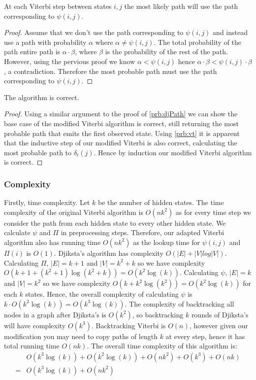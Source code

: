 \begin{lemma}
    \label{prb:vt}
    At each Viterbi step between states $i,j$ the most likely path will use the path corresponding to $\psi(i,j)$.
\end{lemma}
\begin{proof}
Assume that we don't use the path corresponding to $\psi(i,j)$ and instead use a path with probability $\alpha$ where $\alpha \neq \psi(i,j)$.
The total probability of the path entire path is $\alpha \cdot \beta$, where $\beta$ is the probability of the rest of the path.
However, using the pervious proof we know $\alpha < \psi(i,j)$ hence $\alpha \cdot \beta < \psi(i,j) \cdot \beta$, a contradiction. 
Therefore the most probable path must use the path corresponding to $\psi(i,j)$. 
\end{proof}

\begin{lemma}
    \label{prb:final}
    The algorithm is correct. 
\end{lemma}
\begin{proof}
Using a similar argument to the proof of \cref{prb:djPath} we can show the base case of the modified Viterbi algorithm is correct, still returning the most probable path that emits the first observed state. 
Using \cref{prb:vt} it is apparent that the inductive step of our modified Viterbi is also correct, calculating the most probable path to $\delta_t(j)$. Hence by induction our modified Viterbi algorithm is correct.
\end{proof}

  



\subsubsection*{Complexity}
Firstly, time complexity. 
Let $k$ be the number of hidden states.
The time complexity of the original Viterbi algorithm is $O(nk^2)$ as for every time step we consider the path from each hidden state to every other hidden state. We calculate $\psi$ and $\Pi$ in preprocessing steps.
Therefore, our adapted Viterbi algorithm also has running time $O(nk^2)$ as the lookup time for $\psi(i,j)$ and $\Pi(i)$ is $O(1)$.
Djiksta's algorithm has complexity $O(|E|+|V|log|V|)$.
Calculating $\Pi$, $|E| = k+1$ and $|V| = k^2 + k$ so we have complexity $O(k+1 + (k^2+1) \log(k^2+k)) = O(k^2 \log(k))$.
Calculating $\psi$, $|E| = k$ and $|V| = k^2$ so we have complexity $O(k + k^2 \log(k^2)) = O(k^2 \log(k))$ for each $k$ states. Hence, the overall complexity of calculating $\psi$ is $k\cdot O(k^2 \log(k)) = O(k^3 \log(k))$.
The complexity of backtracking all nodes in a graph after Djiksta's is $O(k^2)$, so backtracking $k$ rounds of Djiksta's will have complexity $O(k^3)$.
Backtracking Viterbi is $O(n)$, however given our modification you may need to copy paths of length $k$ at every step, hence it has total running time $O(nk)$. The overall time complexity of this algorithm is:
\begin{align*}
&O(k^3 \log(k)) + O(k^2 \log(k)) + O(nk^2) + O(k^3) + O(nk)\\
=& O(k^3 \log(k)) + O(nk^2)
\end{align*}

